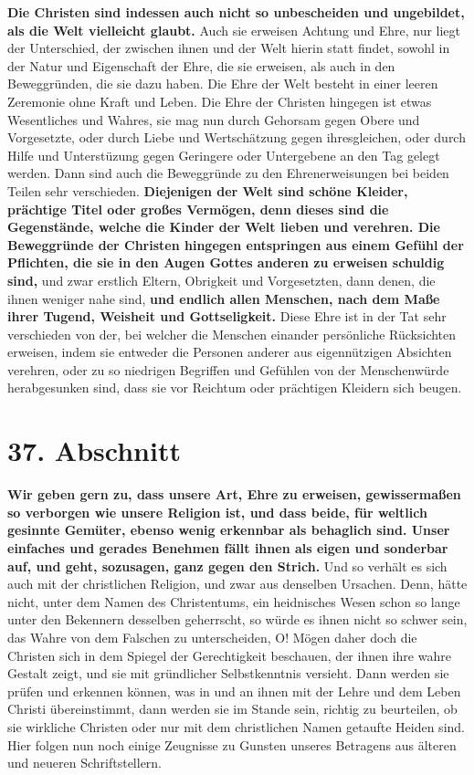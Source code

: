\textbf{Die Christen sind indessen auch nicht so unbescheiden und ungebildet,
als die
Welt vielleicht glaubt.} Auch sie erweisen Achtung und Ehre, nur liegt der
Unterschied, der zwischen ihnen und der Welt hierin statt findet, sowohl in der
Natur und Eigenschaft der Ehre, die sie erweisen, als auch in den Beweggründen,
die sie dazu haben. Die Ehre der Welt besteht in einer leeren Zeremonie ohne
Kraft und Leben. Die Ehre der Christen hingegen ist etwas Wesentliches und
Wahres, sie mag nun durch Gehorsam gegen Obere und Vorgesetzte, oder durch Liebe
und Wertschätzung gegen ihresgleichen, oder durch Hilfe und Unterstüzung gegen
Geringere oder Untergebene an den Tag gelegt werden. Dann sind auch die
Beweggründe zu den Ehrenerweisungen bei beiden Teilen sehr verschieden.
\label{ref:09_36_ehre_erweisen} \textbf{Diejenigen der Welt sind schöne
Kleider, prächtige Titel oder großes
Vermögen, denn dieses sind die Gegenstände, welche die Kinder der Welt
 lieben und
verehren. Die Beweggründe der Christen hingegen entspringen aus einem Gefühl
der Pflichten, die sie in den Augen Gottes anderen zu erweisen schuldig sind,}
und
zwar erstlich Eltern, Obrigkeit und Vorgesetzten, dann denen, die ihnen
weniger nahe sind, \textbf{und endlich allen Menschen, nach dem Maße ihrer
Tugend,
Weisheit und Gottseligkeit.} Diese
Ehre ist in der Tat sehr verschieden von der,
bei welcher die Menschen einander persönliche Rücksichten erweisen, indem
sie
entweder die Personen anderer aus eigennützigen Absichten verehren, oder zu so
niedrigen Begriffen und Gefühlen von der Menschenwürde herabgesunken sind, dass
sie
vor Reichtum oder prächtigen Kleidern sich beugen.

\section{37. Abschnitt} \label{kap9_ab37}

\label{ref:09_37_ehre_erweisen} \textbf{Wir geben gern zu, dass unsere Art,
Ehre zu erweisen, gewissermaßen so verborgen
wie unsere Religion ist, und dass beide, für weltlich
gesinnte
Gemüter, ebenso
wenig erkennbar als behaglich sind. Unser einfaches und gerades Benehmen fällt
ihnen als eigen und sonderbar auf, und geht, sozusagen, ganz gegen den Strich.}
Und so verhält es sich auch mit der christlichen Religion, und zwar aus
denselben Ursachen. Denn, hätte nicht, unter dem Namen des Christentums, ein
heidnisches Wesen schon so lange unter den Bekennern desselben geherrscht, so
würde es ihnen nicht so schwer sein, das Wahre von dem Falschen zu
unterscheiden, O! Mögen daher doch die Christen sich in dem Spiegel der
Gerechtigkeit beschauen, der ihnen ihre wahre
Gestalt
 zeigt, und sie mit
gründlicher Selbstkenntnis versieht. Dann werden sie prüfen und erkennen
können, was in und an ihnen mit der Lehre und dem Leben Christi übereinstimmt,
dann werden sie im Stande sein, richtig zu beurteilen, ob sie wirkliche
Christen oder nur mit dem christlichen Namen getaufte
Heiden sind. Hier
folgen nun noch einige Zeugnisse zu Gunsten unseres Betragens aus älteren und
neueren Schriftstellern.

